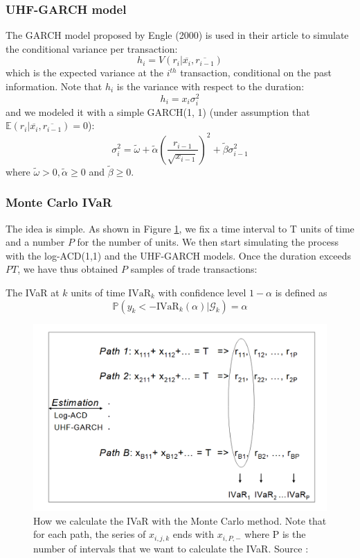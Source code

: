 \documentclass[12pt, a4paper]{article}
\begin{document}
\subsubsection{UHF-GARCH model}
The GARCH model proposed by Engle (2000) is used in their article to simulate the conditional variance per transaction:
$$h_i = V(r_i|\overline{x_i}, \overline{r_{i-1}})$$
which is the expected variance at the $i^{th}$ transaction, conditional on the past information.
Note that $h_i$ is the variance with respect to the duration:
$$h_i = x_i \sigma^2_i$$
and we modeled it with a simple GARCH(1, 1) (under assumption that $\mathbb{E}(r_i|\overline{x_i}, \overline{r_{i-1}}) = 0$):
$$\sigma^2_i = \tilde{\omega} + \tilde{\alpha}\left( \frac{r_{i-1}}{\sqrt{x_{i-1}}} \right)^2 + \tilde{\beta} \sigma^2_{i-1}$$
where $\tilde{\omega} > 0, \tilde{\alpha}\ge 0$ and $\tilde{\beta} \ge 0$.

\subsubsection{Monte Carlo IVaR}
The idea is simple. As shown in Figure \ref{fig:monte_carlo}, we fix a time interval to T units of time and a number $P$ for the number of units. We then start simulating the process with the log-ACD(1,1) and the UHF-GARCH models. Once the duration exceeds $PT$, we have thus obtained $P$ samples of trade transactions:

The IVaR at $k$ units of time $\mbox{IVaR}_k$ with confidence level $1 - \alpha$ is defined as
$$\mathbb{P}\left( y_k < -\mbox{IVaR}_k(\alpha) | \mathcal{G}_k \right) = \alpha$$

\begin{figure}
    \centering
    \includegraphics[scale=0.4]{MonteCarlo.png}
    \caption{How we calculate the IVaR with the Monte Carlo method. Note that for each path, the series of $x_{i,j,k}$ ends with $x_{i,P,-}$ where P is the number of intervals that we want to calculate the IVaR. Source : \cite{Toronto}}
    \label{fig:monte_carlo}
\end{figure}
\end{document}
